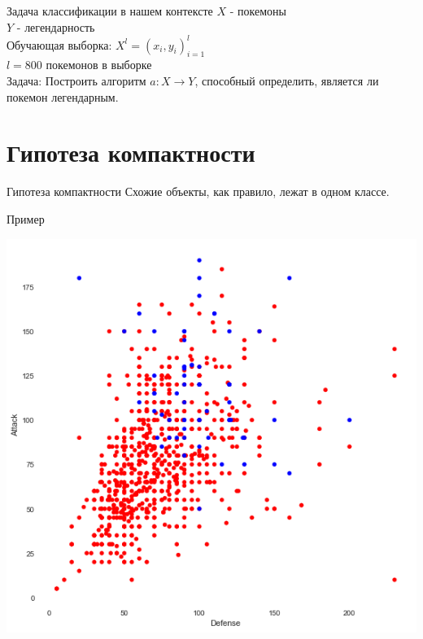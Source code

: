 \documentclass[10pt]{beamer}
\begin{document}
\begin{frame}{Задача классификации в нашем контексте}
	$X$ - покемоны \\
	$Y$ - легендарность \\
	Обучающая выборка: ${X^l = (x_i, y_i)_{i=1}^l}$ \\ 
	$l = 800$ покемонов в выборке\\
	\bigbreak
	\alert{Задача}: Построить алгоритм ${a \colon X \rightarrow Y}$, способный определить, является ли покемон легендарным.
\end{frame}

\section{Гипотеза компактности}

\begin{frame}{Гипотеза компактности}
  \centering
	Схожие объекты, как правило, лежат в одном классе.\\
	\bigbreak
\end{frame}

\begin{frame}{Пример}
  \begin{center}
    	\includegraphics[width=\linewidth,height=0.8 \textheight,keepaspectratio]{images/attack_vs_defense}  
  \end{center}    
\end{frame}
\end{document}
